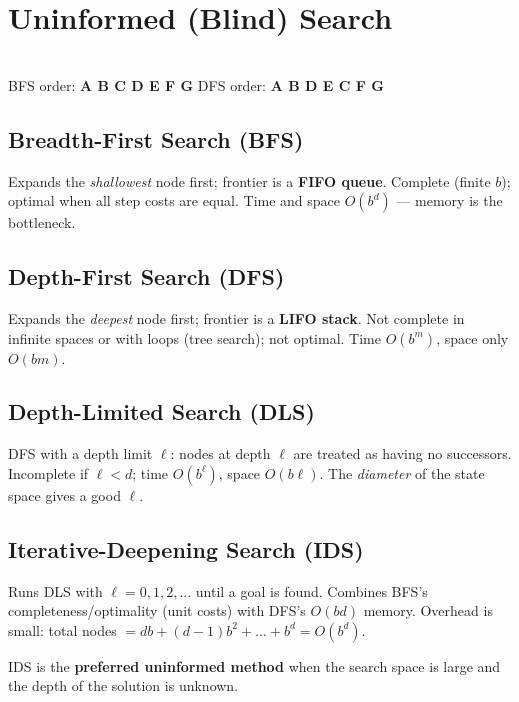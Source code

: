 \section{Uninformed (Blind) Search}
\begin{center}
\\[3pt]
\small BFS order: \textbf{A B C D E F G} \qquad DFS order: \textbf{A B D E C F G}
\end{center}

\subsection{Breadth-First Search (BFS)}
Expands the \emph{shallowest} node first; frontier is a \textbf{FIFO queue}. Complete (finite $b$); optimal when all step costs are equal. Time and space $O(b^{d})$ --- memory is the bottleneck.

\subsection{Depth-First Search (DFS)}
Expands the \emph{deepest} node first; frontier is a \textbf{LIFO stack}. Not complete in infinite spaces or with loops (tree search); not optimal. Time $O(b^{m})$, space only $O(bm)$.

\subsection{Depth-Limited Search (DLS)}
DFS with a depth limit $\ell$: nodes at depth $\ell$ are treated as having no successors. Incomplete if $\ell<d$; time $O(b^{\ell})$, space $O(b\ell)$. The \emph{diameter} of the state space gives a good $\ell$.

\subsection{Iterative-Deepening Search (IDS)}
Runs DLS with $\ell=0,1,2,\dots$ until a goal is found. Combines BFS's completeness/optimality (unit costs) with DFS's $O(bd)$ memory. Overhead is small: total nodes $=db+(d-1)b^{2}+\dots+b^{d}=O(b^{d})$.
\begin{keypoint}
IDS is the \textbf{preferred uninformed method} when the search space is large and the depth of the solution is unknown.
\end{keypoint}

